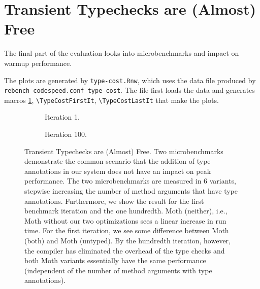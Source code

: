 \documentclass[a4paper,USenglish]{darts-v2019}
\newcommand{\ie}{i.e.\xspace}
\newcommand{\code}[1]{\texttt{#1}}
\begin{document}
\section{Transient Typechecks are (Almost) Free}

The final part of the evaluation looks into microbenchmarks
and impact on warmup performance.

The plots are generated by \code{type-cost.Rnw}, which
uses the data file produced by \code{rebench codespeed.conf type-cost}.
The file first loads the data and generates
macros \cref{fig:type-cost-micro},
\code{\textbackslash{}TypeCostFirstIt},
\code{\textbackslash{}TypeCostLastIt} that make the plots.

\begin{figure}
  \begin{subfigure}[t]{0.5\textwidth}
    \centering
    \TypeCostFirstIt{}
    \caption{Iteration 1.}
  \end{subfigure}\hfill
  \begin{subfigure}[t]{0.5\textwidth}
    \centering
    \TypeCostLastIt{}
    \caption{Iteration 100.}
  \end{subfigure}

  \caption{Transient Typechecks are (Almost) Free.
    Two microbenchmarks demonstrate the common scenario that the addition
    of type annotations in our system does not have an impact on peak performance.
    The two microbenchmarks are measured in 6 variants, stepwise increasing the number
    of method arguments that have type annotations.
    Furthermore, we show the result for the first benchmark iteration and the
    one hundredth.
    Moth (neither), \ie, Moth without our two optimizations sees a linear increase in run time.
    For the first iteration, we see some difference between Moth (both) and Moth (untyped).
    By the hundredth iteration, however, the compiler has eliminated
    the overhead of the type checks
    and both Moth variants essentially have the same performance
    (independent of the number of method arguments with type annotations).}
	\label{fig:type-cost-micro}
\end{figure}
\end{document}
